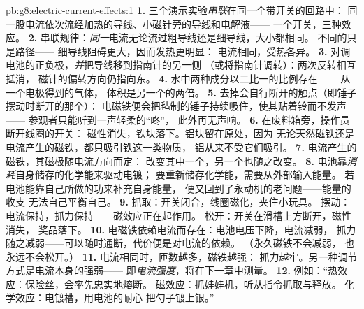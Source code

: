 \begin{solution}{pb:g8:electric-current-effects:1}
\textbf{1.} 三个演示实验\emph{串联}在同一个带开关的回路中：
同一股电流依次流经加热的导线、小磁针旁的导线和电解液——
一个开关，三种效应。
\textbf{2.} 串联规律：\emph{同一}电流无论流过粗导线还是细导线，大小都相同。
不同的只是路径——
细导线阻碍更大，因而发热更明显：
电流相同，受热各异。
\textbf{3.} 对调电池的正负极，\emph{并}把导线移到指南针的另一侧
（或将指南针调转）：两次反转相互抵消，
磁针的偏转方向仍指向东。
\textbf{4.} 水中两种成分以二比一的比例存在——
从一个电极得到的气体，
体积是另一个的两倍。
\textbf{5.} 去掉会自行断开的触点（即锤子摆动时断开的那个）：
电磁铁便会把毡制的锤子持续吸住，使其贴着铃而不发声——
参观者只能听到一声轻柔的“咚”，
此外再无声响。
\textbf{6.} 在废料箱旁，操作员断开线圈的开关：
磁性消失，铁块落下。铝块留在原处，因为
无论天然磁铁还是电流产生的磁铁，都只吸引铁这一类物质，
铝从来不受它们吸引。
\textbf{7.} 电流产生的磁铁，其磁极随电流方向而定：
改变其中一个，另一个也随之改变。
\textbf{8.} 电池靠\emph{消耗}自身储存的化学能来驱动电镀；
要重新储存化学能，需要从外部输入能量。
若电池能靠自己所做的功来补充自身能量，
便又回到了永动机的老问题——能量的收支
无法自己平衡自己。
\textbf{9.} 抓取：开关闭合，线圈磁化，夹住小玩具。
摆动：电流保持，抓力保持——磁效应正在起作用。
松开：开关在滑槽上方断开，磁性消失，
奖品落下。
\textbf{10.} 电磁铁依赖电流而存在：电池电压下降，电流减弱，
抓力随之减弱——可以随时通断，代价便是对电流的依赖。
（永久磁铁不会减弱，
也永远不会松开。）
\textbf{11.} 电流相同时，匝数越多，磁铁越强：
抓力越牢。另一种调节方式是电流本身的强弱——
即\emph{电流强度}，将在下一章中测量。
\textbf{12.} 例如：“热效应：保险丝，会率先忠实地熔断。
磁效应：抓娃娃机，听从指令抓取与释放。
化学效应：电镀槽，用电池的耐心
把勺子镀上银。”
\end{solution}
